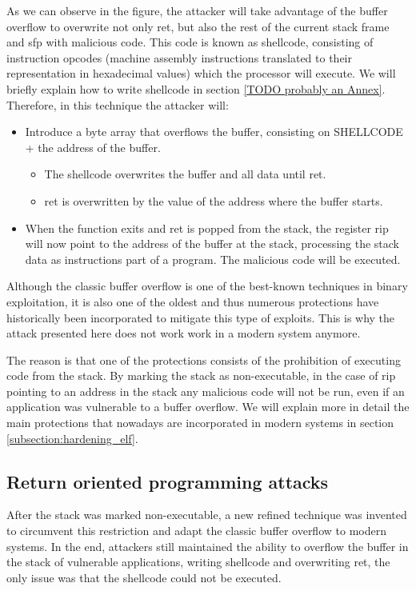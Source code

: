 As we can observe in the figure, the attacker will take advantage of the buffer overflow to overwrite not only ret, but also the rest of the current stack frame and sfp with malicious code. This code is known as shellcode, consisting of instruction opcodes (machine assembly instructions translated to their representation in hexadecimal values) which the processor will execute. We will briefly explain how to write shellcode in section \ref{TODO probably an Annex}. Therefore, in this technique the attacker will:
\begin{itemize}
\item Introduce a byte array that overflows the buffer, consisting on SHELLCODE + the address of the buffer.
\begin{itemize}
	\item The shellcode overwrites the buffer and all data until ret.
	\item ret is overwritten by the value of the address where the buffer starts.
\end{itemize}
\item When the function exits and ret is popped from the stack, the register rip will now point to the address of the buffer at the stack, processing the stack data as instructions part of a program. The malicious code will be executed.
\end{itemize}

Although the classic buffer overflow is one of the best-known techniques in binary exploitation, it is also one of the oldest and thus numerous protections have historically been incorporated to mitigate this type of exploits. This is why the attack presented here does not work work in a modern system anymore. 

The reason is that one of the protections consists of the prohibition of executing code from the stack. By marking the stack as non-executable, in the case of rip pointing to an address in the stack any malicious code will not be run, even if an application was vulnerable to a buffer overflow. We will explain more in detail the main protections that nowadays are incorporated in modern systems in section \ref{subsection:hardening_elf}.

\subsection{Return oriented programming attacks} \label{subsection:rop}
After the stack was marked non-executable, a new refined technique was invented to circumvent this restriction and adapt the classic buffer overflow to modern systems. In the end, attackers still maintained the ability to overflow the buffer in the stack of vulnerable applications, writing shellcode and overwriting ret, the only issue was that the shellcode could not be executed.

